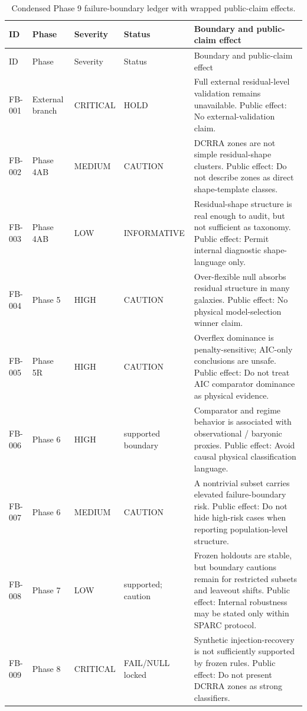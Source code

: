 \documentclass[11pt]{article}
\begin{document}
{\footnotesize
\setlength{\tabcolsep}{3pt}
\renewcommand{\arraystretch}{1.15}
\begin{longtable}{p{}p{}p{}p{}p{}}
\caption{Condensed Phase 9 failure-boundary ledger with wrapped public-claim effects.}\\
\toprule
ID & Phase & Severity & Status & Boundary and public-claim effect \\
\midrule
\endfirsthead
\toprule
ID & Phase & Severity & Status & Boundary and public-claim effect \\
\midrule
\endhead
FB-001 & External branch & CRITICAL & HOLD & Full external residual-level validation remains unavailable. Public effect: No external-validation claim. \\
FB-002 & Phase 4AB & MEDIUM & CAUTION & DCRRA zones are not simple residual-shape clusters. Public effect: Do not describe zones as direct shape-template classes. \\
FB-003 & Phase 4AB & LOW & INFORMATIVE & Residual-shape structure is real enough to audit, but not sufficient as taxonomy. Public effect: Permit internal diagnostic shape-language only. \\
FB-004 & Phase 5 & HIGH & CAUTION & Over-flexible null absorbs residual structure in many galaxies. Public effect: No physical model-selection winner claim. \\
FB-005 & Phase 5R & HIGH & CAUTION & Overflex dominance is penalty-sensitive; AIC-only conclusions are unsafe. Public effect: Do not treat AIC comparator dominance as physical evidence. \\
FB-006 & Phase 6 & HIGH & supported boundary & Comparator and regime behavior is associated with observational / baryonic proxies. Public effect: Avoid causal physical classification language. \\
FB-007 & Phase 6 & MEDIUM & CAUTION & A nontrivial subset carries elevated failure-boundary risk. Public effect: Do not hide high-risk cases when reporting population-level structure. \\
FB-008 & Phase 7 & LOW & supported; caution & Frozen holdouts are stable, but boundary cautions remain for restricted subsets and leaveout shifts. Public effect: Internal robustness may be stated only within SPARC protocol. \\
FB-009 & Phase 8 & CRITICAL & FAIL/NULL locked & Synthetic injection-recovery is not sufficiently supported by frozen rules. Public effect: Do not present DCRRA zones as strong classifiers. \\

\end{longtable}}
\end{document}
